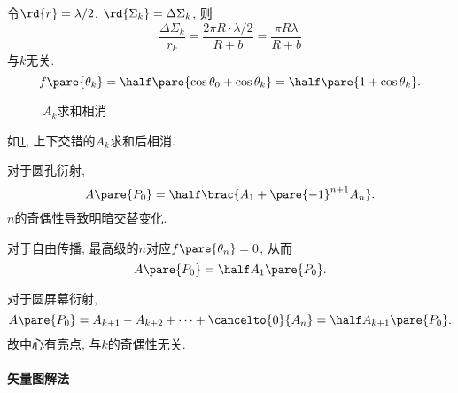 \documentclass{ctexart}
\begin{document}
令$\rd{r} = \lambda/2$, $\rd{\Sigma_k} = \Delta \Sigma_k$, 则
\[ \frac{\Delta \Sigma_k}{r_k} = \frac{2\pi R \cdot\lambda/2}{R+b} = \frac{\pi R\lambda}{R+b} \]
与$k$无关.
\[ f\pare{\theta_k} = \half\pare{\cos\theta_0 + \cos\theta_k} = \half\pare{1+\cos\theta_k}. \]
\begin{figure}
    \centering
    \caption{$A_k$求和相消}
    \label{fig:a_k求和相消}
\end{figure}
如\cref{fig:a_k求和相消}, 上下交错的$A_k$求和后相消.
\begin{cenum}
    \item 对于圆孔衍射,
    \[ A\pare{P_0} = \half \brac{A_1 + \pare{-1}^{n+1}A_n}. \]
    $n$的奇偶性导致明暗交替变化.
    \item 对于自由传播, 最高级的$n$对应$f\pare{\theta_n} = 0$, 从而
    \[ A\pare{P_0} = \half A_1\pare{P_0}. \]
    \item 对于圆屏幕衍射,
    \[ A\pare{P_0} = A_{k+1} - A_{k+2} + \cdots + \cancelto{0}{A_n} = \half A_{k+1}\pare{P_0}. \]
    故中心有亮点, 与$k$的奇偶性无关.
\end{cenum}

\paragraph{矢量图解法} %
\label{par:矢量图解法}
\end{document}
